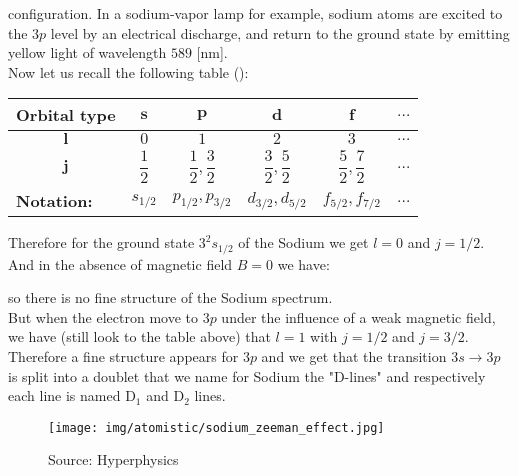 	\begin{tcolorbox}[colframe=black,colback=white,sharp corners]
	
	configuration. In a sodium-vapor lamp for example, sodium atoms are excited to the $3p$ level by an electrical discharge, and return to the ground state by emitting yellow light of wavelength $589$ [nm].\\
	
	Now let us recall the following table ():
	\begin{table}[H]
		\centering
		\renewcommand{\arraystretch}{2.6}
		\begin{tabular}{|c|c|c|c|c|c|}
		\hline
		\rowcolor[HTML]{9B9B9B} 
		\textbf{Orbital type} & \textbf{$\pmb{s}$} & \textbf{$\pmb{p}$} & \textbf{$\pmb{d}$} & \textbf{$\pmb{f}$} & \textbf{$\pmb{\ldots}$} \\ \hline
		\cellcolor[HTML]{9B9B9B}\textbf{$\pmb{l}$} & $0$ & $1$ & $2$ & $3$ & $\ldots$ \\ \hline
		\cellcolor[HTML]{9B9B9B}\textbf{$\pmb{j}$} & $\dfrac{1}{2}$ & $\dfrac{1}{2},\dfrac{3}{2}$ & $\dfrac{3}{2},\dfrac{5}{2}$ & $\dfrac{5}{2},\dfrac{7}{2}$ & $\ldots$ \\ \hline
		\multicolumn{1}{|l|}{\cellcolor[HTML]{9B9B9B}\textbf{Notation:}} & $s_{1/2}$ & $p_{1/2},p_{3/2}$ & $d_{3/2},d_{5/2}$ & $f_{5/2},f_{7/2}$ & $\ldots$ \\ \hline
		\end{tabular}
	\end{table}
	Therefore for the ground state $3^2s_{1/2}$ of the Sodium we get $l=0$ and $j=1/2$. And in the absence of magnetic field $B=0$ we have:
	
	so there is no fine structure of the Sodium spectrum.\\
	
	But when the electron move to $3p$ under the influence of a weak magnetic field, we have (still look to the table above) that $l=1$ with $j=1/2$ and $j=3/2$. \\
	
	Therefore a fine structure appears for $3p$ and we get that the transition $3s\rightarrow 3p$ is split into a doublet that we name for Sodium the "D-lines" and respectively each line is named $\text{D}_1$ and $\text{D}_2$ lines. 
	\begin{figure}[H]
		\centering
		\texttt{[image: img/atomistic/sodium\_zeeman\_effect.jpg]}	
		\caption{Source: Hyperphysics}
	\end{figure}
	\end{tcolorbox}
	
